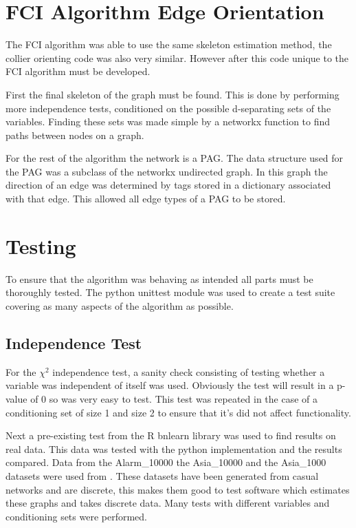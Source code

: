 \documentclass{UoYCSproject}
\begin{document}
\section{FCI Algorithm Edge Orientation}

The FCI algorithm was able to use the same skeleton estimation method, the  collier orienting code was also very similar. However after this code unique to the FCI algorithm must be developed.

First the final skeleton of the graph must be found. This is done by performing more independence tests, conditioned on the possible d-separating sets of the variables. Finding these sets was made simple by a networkx function to find paths between nodes on a graph.

For the rest of the algorithm the network is a PAG. The data structure used for the PAG was a subclass of the networkx undirected graph. In this graph the direction of an edge was determined by tags stored in a dictionary associated with that edge. This allowed all edge types of a PAG to be stored.

\section{Testing}


To ensure that the algorithm was behaving as intended all parts must be thoroughly tested. The python unittest module was used to create a test suite covering as many aspects of the algorithm as possible.
\subsection{Independence Test}
For the $\chi^2$ independence test, a sanity check consisting of testing whether a variable was independent of itself was used. Obviously the test will result in a p-value of 0 so was very easy to test. This test was repeated in the case of a conditioning set of size 1 and size 2 to ensure that it's did not affect functionality.

Next a pre-existing test from the R bnlearn library was used to find results on real data. This data was tested with the python implementation and the results compared. Data from the Alarm\_10000 the Asia\_10000 and the Asia\_1000 datasets were used from \parencite{data}. These datasets have been generated from casual networks and are discrete, this makes them good to test software which estimates these graphs and takes discrete data. Many tests with different variables and conditioning sets were performed.
\end{document}
